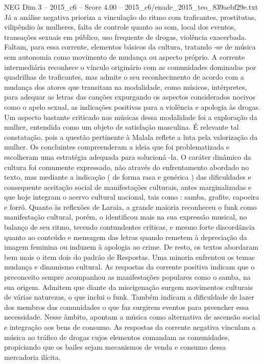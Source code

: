\begin{textsample}{NEG Dim 3 – 2015\_c6 – Score 4.00 – 2015\_c6/enade\_2015\_teo\_839aebf29e.txt}
Já a análise negativa prioriza a vinculação do ritmo com traficantes, prostitutas, vilipêndio às mulheres, falta de controle quanto ao som, local dos eventos, transações sexuais em público, uso frequente de drogas, violência exacerbada.
Faltam, para essa corrente, elementos básicos da cultura, tratando -se de música sem autonomia como movimento de mudança ou aspecto próprio.
A corrente intermediária reconhece o vínculo originário com as comunidades dominadas por quadrilhas de traficantes, mas admite o seu reconhecimento de acordo com a mudança dos atores que transitam na modalidade, como músicos, intérpretes, para adequar as letras das canções expurgando os aspectos considerados nocivos como o apelo sexual, as indicações positivas para a violência e apologia às drogas.
Um aspecto bastante criticado nas músicas dessa modalidade foi a exploração da mulher, entendida como um objeto de satisfação masculina.
É relevante tal constatação, pois a questão pertinente à Malala reflete a luta pela valorização da mulher.
Os concluintes compreenderam a ideia que foi problematizada e escolheram uma estratégia adequada para solucioná -la.
O caráter dinâmico da cultura foi comumente expressado, não através do enfrentamento abordado no texto, mas mediante a indicação ( de forma rasa e genérica ) das dificuldades e consequente aceitação social de manifestações culturais, antes marginalizadas e que hoje integram o acervo cultural nacional, tais como : samba, grafite, capoeira e forró.
Quanto às reflexões de Laraia, a grande maioria reconheceu o funk como manifestação cultural, porém, o identificou mais na sua expressão musical, no balanço de seu ritmo, tecendo contundentes críticas, e mesmo forte discordância quanto ao conteúdo e mensagem das letras quando remetem à depreciação da imagem feminina ou induzem à apologia ao crime.
De resto, os textos abordaram bem mais o item dois do padrão de Respostas.
Uma minoria enfrentou os temas mudança e dinamismo cultural.
As respostas da corrente positiva indicam que o preconceito sempre acompanhou as manifestações populares como o samba, na sua origem.
Admitem que diante da miscigenação surgem movimentos culturais de várias naturezas, o que inclui o funk.
Também indicam a dificuldade de lazer dos membros das comunidades o que faz surgirem eventos para preencher essa necessidade.
Nesse âmbito, apontam a música como alternativa de ascensão social e integração aos bens de consumo.
As respostas da corrente negativa vinculam a música ao tráfico de drogas cujos elementos comandam as comunidades, propiciando que os bailes sejam mecanismos de venda e consumo dessa mercadoria ilícita.

\end{textsample}
